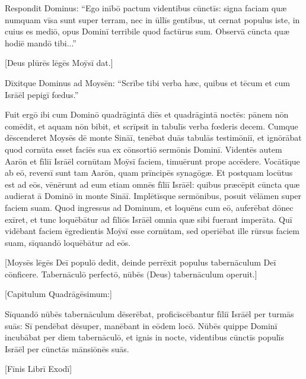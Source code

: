 Respondit Dominus: ``Ego inībō pactum videntibus cūnctīs: signa faciam quæ numquam vīsa sunt
super terram, nec in ūllīs gentibus, ut cernat populus iste, in cuius es
mediō, opus Dominī terribile quod factūrus sum. 
Observā cūncta quæ hodiē mandō tibi...''

[Deus plūrēs lēgēs Moȳsī dat.] 

Dīxitque Dominus ad
Moysēn: ``Scrībe tibi verba hæc, quibus et tēcum et cum
Isrāēl pepigī fœdus.''

Fuit ergō ibi cum
Dominō quadrāgintā diēs et quadrāgintā noctēs: pānem nōn comēdit, et aquam
nōn bibit, et scrīpsit in tabulīs verba fœderis decem. 
Cumque
dēscenderet Moysēs dē monte Sināī, tenēbat duās tabulās testimōniī, et ignōrābat quod
cornūta esset faciēs sua ex
cōnsortiō
sermōnis Dominī. 
Videntēs autem Aarōn et fīliī Isrāēl
cornūtam Moȳsī faciem, timuērunt prope accēdere. 
Vocātīque ab eō, reversī sunt tam Aarōn, quam prīncipēs
synagōgæ. Et postquam locūtus est ad eōs, 
vēnērunt ad
eum etiam omnēs fīliī Isrāēl: quibus præcēpit cūncta quæ audierat ā Dominō
in monte Sināī. 
Implētīsque sermōnibus, posuit vēlāmen
super faciem suam. 
Quod ingressus ad Dominum,
et loquēns cum eō, auferēbat dōnec exīret, et tunc loquēbātur ad fīliōs
Isrāēl omnia quæ sibi fuerant imperāta. 
Quī vidēbant faciem ēgredientis
Moȳsī esse cornūtam, sed operiēbat ille rūrsus faciem suam,
sīquandō loquēbātur ad eōs.

[Moysēs lēgēs Deī populō dedit,
deinde perrēxit populus tabernāculum Deī cōnficere.
Tabernāculō perfectō, nūbēs (Deus) tabernāculum operuit.]

[Capitulum Quadrāgēsimum:]

Sīquandō nūbēs tabernāculum dēserēbat,
proficīscēbantur fīliī Isrāēl per turmās
suās: 
Sī pendēbat dēsuper, manēbant in
eōdem locō. 
Nūbēs quippe Dominī
incubābat per diem tabernāculō, et ignis in nocte,
videntibus cūnctīs populīs Isrāēl per cūnctās mānsiōnēs suās.

[Fīnis Librī Exodī] 
